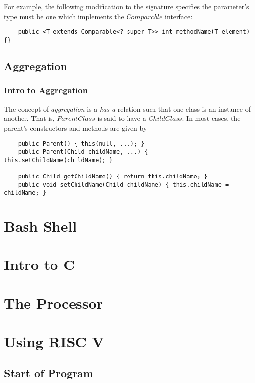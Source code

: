 \documentclass[oneside,11pt]{book}
\begin{document}
\bigskip
For example, the following modification to the signature specifies the parameter's type must be one which implements the \cverb$Comparable$ interface:
\begin{verbatim}
    public <T extends Comparable<? super T>> int methodName(T element) {}
\end{verbatim}

\section{Aggregation}

\subsection{Intro to Aggregation}

The concept of \emph{aggregation} is a \emph{has-a} relation such that one class is an instance of another. That is, \cverb$ParentClass$ is said to have a \cverb$ChildClass$. In most cases, the parent's constructors and methods are given by
\begin{verbatim}
    public Parent() { this(null, ...); }
    public Parent(Child childName, ...) { this.setChildName(childName); }

    public Child getChildName() { return this.childName; }
    public void setChildName(Child childName) { this.childName = childName; }
\end{verbatim}


\chapter{Bash Shell}

\chapter{Intro to C}

\chapter{The Processor}

\chapter{Using RISC V}

\section{Start of Program}
\end{document}
